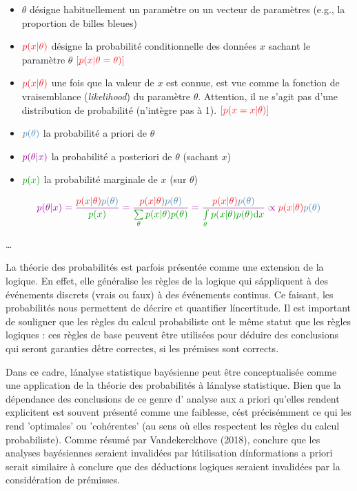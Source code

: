 \documentclass[
  a4paper,11pt,twoside,onecolumn,openright,final,oldfontcommands]{memoir}
\theoremstyle{definition}
\theoremstyle{definition}
\theoremstyle{definition}
\theoremstyle{definition}
\theoremstyle{remark}
\begin{document}
\begin{itemize}
\item
  \(\theta\) désigne habituellement un paramètre ou un vecteur de paramètres (e.g., la proportion de billes bleues)
\item
  \(\color{orangered}{p(x\vert \theta)}\) { désigne la probabilité conditionnelle des données \(x\) sachant le paramètre \(\theta\) } \(\color{orangered}{[p(x | \theta = \theta)]}\)
\item
  \(\color{orangered}{p(x\vert \theta)}\) { une fois que la valeur de \(x\) est connue, est vue comme la fonction de vraisemblance (\emph{likelihood}) du paramètre \(\theta\). Attention, il ne s'agit pas d'une distribution de probabilité (n'intègre pas à 1). } \(\color{orangered}{[p(x = x | \theta)]}\)
\item
  \(\color{steelblue}{p(\theta)}\) { la probabilité a priori de \(\theta\)}
\item
  \(\color{purple}{p(\theta \vert x)}\) { la probabilité a posteriori de \(\theta\) (sachant \(x\))}
\item
  \(\color{green}{p(x)}\) { la probabilité marginale de \(x\) (sur \(\theta\))}
\end{itemize}

\[
\color{purple}{p(\theta \vert x)} = \dfrac{\color{orangered}{p(x\vert \theta)} \color{steelblue}{p(\theta)}}{\color{green}{p(x)}} = \dfrac{\color{orangered}{p(x\vert \theta)} \color{steelblue}{p(\theta)}}{\color{green}{\sum\limits_{\theta}p(x|\theta)p(\theta)}} = \dfrac{\color{orangered}{p(x\vert \theta)} \color{steelblue}{p(\theta)}}{\color{green}{\int\limits_{\theta}p(x|\theta)p(\theta)\mathrm{d}x}} \propto \color{orangered}{p(x\vert \theta)} \color{steelblue}{p(\theta)}
\]

\ldots{}

\begin{keyconcepts}{1.1}
La théorie des probabilités est parfois présentée comme une extension de la logique. En effet, elle généralise les règles de la logique qui s\' appliquent à des événements discrets (vrais ou faux) à des événements continus. Ce faisant, les probabilités nous permettent de décrire et quantifier l\' incertitude. Il est important de souligner que les règles du calcul probabiliste ont le même statut que les règles logiques : ces règles de base peuvent être utilisées pour déduire des conclusions qui seront garanties d\' être correctes, si les prémises sont corrects.

Dans ce cadre, l\' analyse statistique bayésienne peut être conceptualisée comme une application de la théorie des probabilités à l\'analyse statistique. Bien que la dépendance des conclusions de ce genre d' analyse aux a priori qu'elles rendent explicitent est souvent présenté comme une faiblesse, c\'est précisémment ce qui les rend 'optimales' ou 'cohérentes' (au sens où elles respectent les règles du calcul probabiliste). Comme résumé par Vandekerckhove (2018), conclure que les analyses bayésiennes seraient invalidées par l\' utilisation d\' informations a priori serait similaire à conclure que des déductions logiques seraient invalidées par la considération de prémisses.
\end{keyconcepts}
\end{document}
